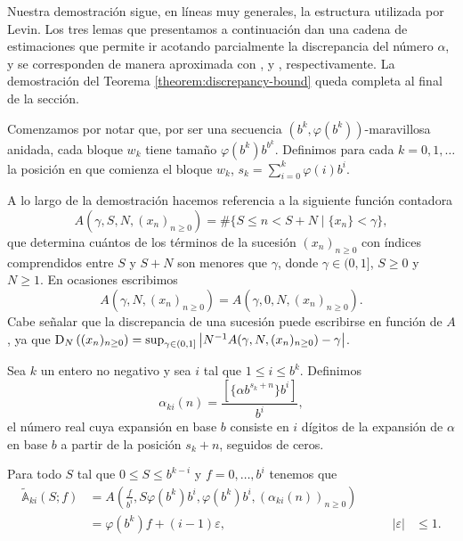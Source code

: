 
Nuestra demostración sigue, en líneas muy generales, la estructura utilizada
por Levin. Los tres lemas que presentamos
a continuación dan una cadena de estimaciones que permite ir acotando
parcialmente la discrepancia del número $\alpha$, y se corresponden de
manera aproximada con \cite[Lemma 5]{levin-discrepancy-estimate},
\cite[Corollary 1]{levin-discrepancy-estimate}
y \cite[Corollary 2]{levin-discrepancy-estimate}, respectivamente.
La demostración del Teorema \ref{theorem:discrepancy-bound} queda completa
al final de la sección.

Comenzamos por notar que, por ser una secuencia
$(b^k, \varphi(b^k))$-maravillosa anidada, cada bloque $w_k$ tiene tamaño
$\varphi(b^k)b^{b^k}$.
Definimos para cada $k = 0, 1, \dots$ la posición en que comienza el bloque
$w_k$, $s_k = \sum_{i=0}^k \varphi(i) b^i$.

A lo largo de la demostración hacemos referencia a la siguiente función contadora
\[ A\left(\gamma, S, N, \left(x_n\right)_{n\geq0} \right)
	= \# \lbrace S \leq n < S + N \;\vert\; \lbrace x_n \rbrace < \gamma \rbrace, \]
que determina cuántos de los términos de la sucesión $\left(x_n\right)_{n\geq0}$
con índices comprendidos entre $S$ y $S+N$ son menores que $\gamma$, donde
$\gamma \in (0, 1]$, $S \geq 0$ y $N \geq 1$. En ocasiones escribimos
\[ A\left(\gamma, N, \left(x_n\right)_{n\geq0} \right)
	= A\left(\gamma, 0, N, \left(x_n\right)_{n\geq0} \right). \]
Cabe señalar que la discrepancia de una sucesión puede escribirse en función de
$A$, ya que $\operatorname{D}_{N}\left( (x_n)_{n \geq 0}\right)
= \sup_{\gamma \in (0,1]} \left\vert N^{-1} A(\gamma, N,
(x_n)_{n \geq 0}) - \gamma \right\vert$.

\begin{lemma}
	\label{lemma:discrepancy-1}
	Sea $k$ un entero no negativo y sea $i$ tal que $1 \leq i \leq b^k$. Definimos
	\[ \alpha_{ki}(n) = \frac{[\lbrace \alpha b^{s_k + n} \rbrace b^i]}{b^i}, \]
	el número real cuya expansión en base $b$ consiste en $i$ dígitos de la
	expansión de $\alpha$ en base $b$ a partir de la posición $s_k + n$,
	seguidos de ceros.

	Para todo $S$ tal que $0 \leq S \leq b^{k-i}$ y
	$f = 0, \dots, b^i$ tenemos que
	\begin{align*}
		\tilde{\mathbb{A}}_{ki}(S;f)
		&= A\left(\frac{f}{b^i}, S \varphi(b^k) b^i, \varphi(b^k) b^i,
			\left(\alpha_{ki}(n)\right)_{n\geq0} \right) \\
		&= \varphi(b^k)f + (i - 1)\varepsilon,
			&\qquad \vert\varepsilon\vert &\leq 1.
	\end{align*}
\end{lemma}

